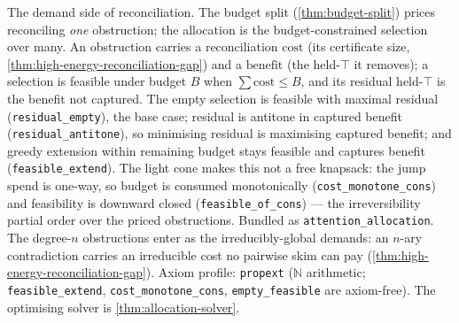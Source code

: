 \begin{theorem}\label{thm:attention-allocation}\leanok{}
The demand side of reconciliation. The budget split (\cref{thm:budget-split})
prices reconciling \emph{one} obstruction; the allocation is the
budget-constrained selection over many. An obstruction carries a reconciliation
\(\mathrm{cost}\) (its certificate size, \cref{thm:high-energy-reconciliation-gap})
and a \(\mathrm{benefit}\) (the held-\(\top\) it removes); a selection is feasible
under budget \(B\) when \(\sum \mathrm{cost} \le B\), and its residual held-\(\top\)
is the benefit not captured. The empty selection is feasible with maximal residual
(\texttt{residual\_empty}), the base case; residual is antitone in captured benefit
(\texttt{residual\_antitone}), so minimising residual is maximising captured
benefit; and greedy extension within remaining budget stays feasible and captures
benefit (\texttt{feasible\_extend}). The light cone makes this not a free knapsack:
the jump spend is one-way, so budget is consumed monotonically
(\texttt{cost\_monotone\_cons}) and feasibility is downward closed
(\texttt{feasible\_of\_cons}) --- the irreversibility partial order over the priced
obstructions. Bundled as \texttt{attention\_allocation}. The degree-\(n\)
obstructions enter as the irreducibly-global demands: an \(n\)-ary contradiction
carries an irreducible cost no pairwise skim can pay
(\cref{thm:high-energy-reconciliation-gap}). Axiom profile: \texttt{propext}
(\(\mathbb N\) arithmetic; \texttt{feasible\_extend}, \texttt{cost\_monotone\_cons},
\texttt{empty\_feasible} are axiom-free). The optimising solver is
\cref{thm:allocation-solver}.
\end{theorem}

